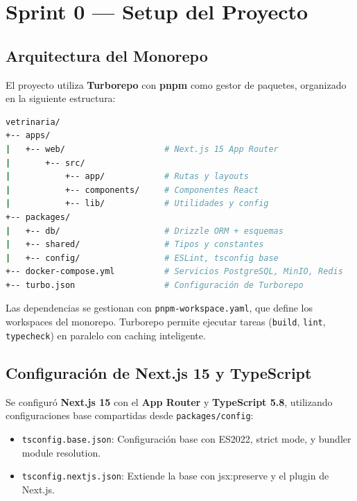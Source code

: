 \documentclass[12pt,a4paper]{article}
\begin{document}
\section{Sprint 0 — Setup del Proyecto}

\subsection{Arquitectura del Monorepo}

El proyecto utiliza \textbf{Turborepo} con \textbf{pnpm} como gestor de paquetes,
organizado en la siguiente estructura:

\begin{lstlisting}[language=bash, caption=Estructura del monorepo]
vetrinaria/
+-- apps/
|   +-- web/                    # Next.js 15 App Router
|       +-- src/
|           +-- app/            # Rutas y layouts
|           +-- components/     # Componentes React
|           +-- lib/            # Utilidades y config
+-- packages/
|   +-- db/                     # Drizzle ORM + esquemas
|   +-- shared/                 # Tipos y constantes
|   +-- config/                 # ESLint, tsconfig base
+-- docker-compose.yml          # Servicios PostgreSQL, MinIO, Redis
+-- turbo.json                  # Configuración de Turborepo
\end{lstlisting}

Las dependencias se gestionan con \texttt{pnpm-workspace.yaml}, que define los
workspaces del monorepo. Turborepo permite ejecutar tareas (\texttt{build},
\texttt{lint}, \texttt{typecheck}) en paralelo con caching inteligente.

\subsection{Configuración de Next.js 15 y TypeScript}

Se configuró \textbf{Next.js 15} con el \textbf{App Router} y \textbf{TypeScript 5.8},
utilizando configuraciones base compartidas desde \texttt{packages/config}:

\begin{itemize}[leftmargin=*]
    \item \texttt{tsconfig.base.json}: Configuración base con ES2022, strict mode,
          y bundler module resolution.
    \item \texttt{tsconfig.nextjs.json}: Extiende la base con jsx:preserve y
          el plugin de Next.js.
\end{itemize}
\end{document}
